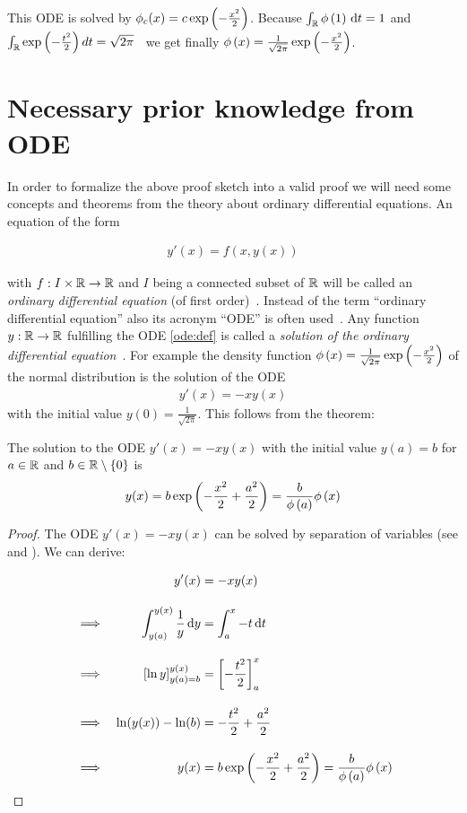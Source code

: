 This ODE is solved by $\phi_c(x) = c \exp\left( {-\frac{x^2}2} \right)$. Because $\int_\mathbb R \phi\left( {1} \right) \,\mathrm d{t} = 1$ and $\int_\mathbb R \exp\left( {-\frac{t^2}2} \right) d{t} = \sqrt{2\pi}$~\cite[p. 47]{georgii} we get finally $\phi\left( {x} \right) = \frac{1}{\sqrt{2\pi}} \exp\left( {-\frac{x^2}2} \right)$.

\section{Necessary prior knowledge from ODE}

In order to formalize the above proof sketch into a valid proof we will need some concepts and theorems from the theory about ordinary differential equations. An equation of the form

\begin{align} \label{ode:def}
  y'(x) = f(x,y(x))
\end{align}

with $f:I \times \mathbb R \to \mathbb R$ and $I$ being a connected subset of $\mathbb R$ will be called an \emph{ordinary differential equation} (of first order)~\cite[p. 465]{stoer}\cite{wiki:ode}. Instead of the term ``ordinary differential equation'' also its acronym ``ODE'' is often used~\cite[p. 2]{ricardo}\cite{wiki:ode}. Any function $y:\mathbb R\to\mathbb R$ fulfilling the ODE \eqref{ode:def} is called a \emph{solution of the ordinary differential equation}~\cite[p. 8]{ricardo}\cite{wiki:ode}. For example the density function $\phi\left( {x} \right) = \frac{1}{\sqrt{2\pi}} \exp\left( {-\frac{x^2}2} \right)$ of the normal distribution is the solution of the ODE
\begin{align}
  y'(x) = -xy(x)
\end{align}
with the initial value $y(0) = \frac{1}{\sqrt{2\pi}}$. This follows from the theorem:

\begin{theorem} \label{chr_ode}
  The solution to the ODE $y'(x) = -xy(x)$ with the initial value $y(a)=b$ for $a\in\mathbb R$ and $b\in \mathbb R\setminus\{0\}$ is
  \begin{align}
    y(x) = b \exp\left( {-\frac{x^2}2+\frac{a^2}2} \right) = \frac{b}{\phi\left( {a} \right)} \phi\left( {x} \right)
  \end{align}
\end{theorem}

\begin{proof}
  The ODE $y'(x)=-xy(x)$ can be solved by separation of variables (see \cite[p. 28]{ricardo} and \cite{wiki:separation}). We can derive:

  \begin{align}
      && y'(x)& =-xy(x) \bnl
      &\implies & \int_{y(a)}^{y(x)} \frac 1y \d{y} & = \int_a^x -t \d{t} \bnl
      &\implies & \left[\ln{y}\right]^{y(x)}_{y(a)=b} & = \left[-\frac{t^2}2\right]_a^x \bnl
      &\implies & \ln(y(x))-\ln(b) &= -\frac{t^2}2 + \frac{a^2}2 \bnl
      &\implies & y(x) &= b \fexp{-\frac{x^2}2 + \frac{a^2}2} = \frac b{\fphi{a}}\fphi{x}
  \end{align}
\end{proof}
    
